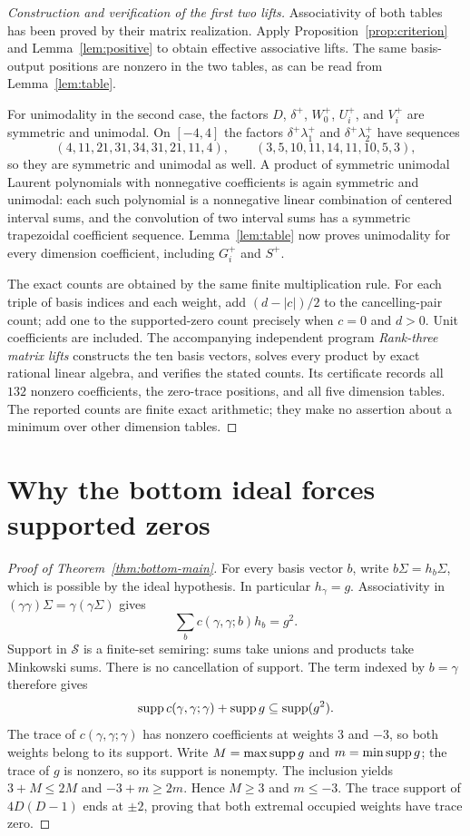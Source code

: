 \documentclass[11pt]{article}
\theoremstyle{definition}\newtheorem{definition}[theorem]{Definition}
\begin{document}
\begin{proof}[Construction and verification of the first two lifts]
Associativity of both tables has been proved by their matrix realization. Apply Proposition~\ref{prop:criterion} and Lemma~\ref{lem:positive} to obtain effective associative lifts. The same basis-output positions are nonzero in the two tables, as can be read from Lemma~\ref{lem:table}.

For unimodality in the second case, the factors $D$, $\delta^+$, $W_0^+$, $U_i^+$, and $V_i^+$ are symmetric and unimodal. On $[-4,4]$ the factors $\delta^+\lambda_1^+$ and $\delta^+\lambda_2^+$ have sequences
\[
 (4,11,21,31,34,31,21,11,4),\qquad
 (3,5,10,11,14,11,10,5,3),
\]
so they are symmetric and unimodal as well. A product of symmetric unimodal Laurent polynomials with nonnegative coefficients is again symmetric and unimodal: each such polynomial is a nonnegative linear combination of centered interval sums, and the convolution of two interval sums has a symmetric trapezoidal coefficient sequence. Lemma~\ref{lem:table} now proves unimodality for every dimension coefficient, including $G_i^+$ and $S^+$.

The exact counts are obtained by the same finite multiplication rule. For each triple of basis indices and each weight, add $(d-|c|)/2$ to the cancelling-pair count; add one to the supported-zero count precisely when $c=0$ and $d>0$. Unit coefficients are included. The accompanying independent program \emph{Rank-three matrix lifts} constructs the ten basis vectors, solves every product by exact rational linear algebra, and verifies the stated counts. Its certificate records all $132$ nonzero coefficients, the zero-trace positions, and all five dimension tables. The reported counts are finite exact arithmetic; they make no assertion about a minimum over other dimension tables.
\end{proof}



\section{Why the bottom ideal forces supported zeros}\label{sec:bottom}
\begin{proof}[Proof of Theorem~\ref{thm:bottom-main}]
For every basis vector $b$, write $b\Sigma=h_b\Sigma$, which is possible by the ideal hypothesis. In particular $h_\gamma=g$. Associativity in $(\gamma\gamma)\Sigma=\gamma(\gamma\Sigma)$ gives
\[
 \sum_b c(\gamma,\gamma;b)h_b=g^2.
\]
Support in $\mathcal S$ is a finite-set semiring: sums take unions and products take Minkowski sums. There is no cancellation of support. The term indexed by $b=\gamma$ therefore gives
\[
 \operatorname{supp} c(\gamma,\gamma;\gamma)+\operatorname{supp} g
 \subseteq\operatorname{supp}(g^2).
\]
The trace of $c(\gamma,\gamma;\gamma)$ has nonzero coefficients at weights $3$ and $-3$, so both weights belong to its support. Write $M=\max\operatorname{supp} g$ and $m=\min\operatorname{supp} g$; the trace of $g$ is nonzero, so its support is nonempty. The inclusion yields $3+M\le2M$ and $-3+m\ge2m$. Hence $M\ge3$ and $m\le-3$. The trace support of $4D(D-1)$ ends at $\pm2$, proving that both extremal occupied weights have trace zero.
\end{proof}
\end{document}
